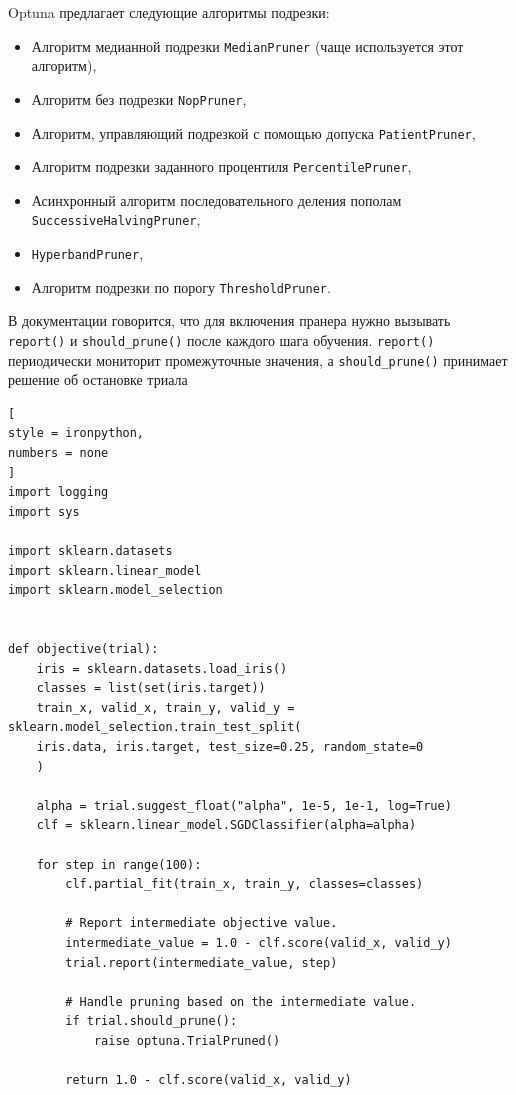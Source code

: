 \documentclass[%
	11pt,
	a4paper,
	utf8,
		]{article}
\begin{document}
Optuna предлагает следующие алгоритмы подрезки:
\begin{itemize}
	\item Алгоритм медианной подрезки \verb|MedianPruner| (чаще используется этот алгоритм),
	
	\item Алгоритм без подрезки \verb|NopPruner|,
	
	\item Алгоритм, управляющий подрезкой с помощью допуска \verb|PatientPruner|,
	
	\item Алгоритм подрезки заданного процентиля \verb|PercentilePruner|,
	
	\item Асинхронный алгоритм последовательного деления пополам \verb|SuccessiveHalvingPruner|,
	
	\item \verb|HyperbandPruner|,
	
	\item Алгоритм подрезки по порогу \verb|ThresholdPruner|.
\end{itemize}

В документации говорится, что для включения пранера нужно вызывать \verb|report()| и \verb|should_prune()| после каждого шага обучения. \verb|report()| периодически мониторит промежуточные значения, а \verb|should_prune()| принимает решение об остановке триала
\begin{lstlisting}[
style = ironpython,
numbers = none
]
import logging
import sys

import sklearn.datasets
import sklearn.linear_model
import sklearn.model_selection


def objective(trial):
	iris = sklearn.datasets.load_iris()
	classes = list(set(iris.target))
	train_x, valid_x, train_y, valid_y = sklearn.model_selection.train_test_split(
	iris.data, iris.target, test_size=0.25, random_state=0
	)

	alpha = trial.suggest_float("alpha", 1e-5, 1e-1, log=True)
	clf = sklearn.linear_model.SGDClassifier(alpha=alpha)

	for step in range(100):
		clf.partial_fit(train_x, train_y, classes=classes)
		
		# Report intermediate objective value.
		intermediate_value = 1.0 - clf.score(valid_x, valid_y)
		trial.report(intermediate_value, step)
		
		# Handle pruning based on the intermediate value.
		if trial.should_prune():
			raise optuna.TrialPruned()
		
		return 1.0 - clf.score(valid_x, valid_y)
\end{lstlisting}
\end{document}
